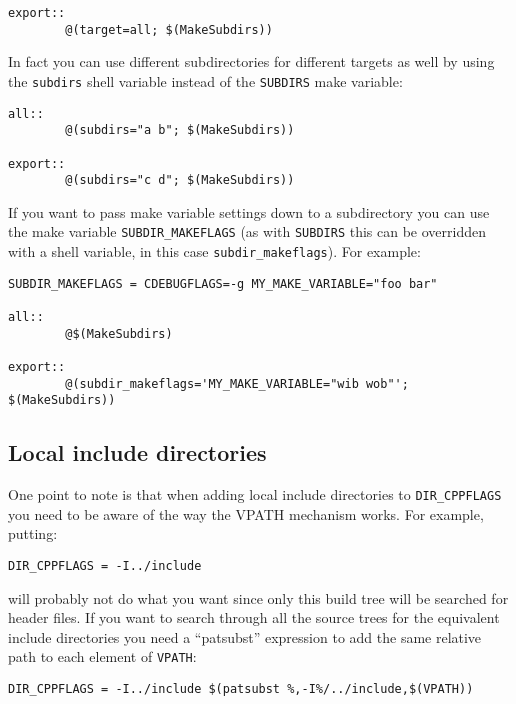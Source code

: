 \documentclass[11pt,twoside,onecolumn]{article}
\begin{document}
{\footnotesize \begin{verbatim}
export::
        @(target=all; $(MakeSubdirs))
\end{verbatim}}

In fact you can use different subdirectories for different targets as well by
using the {\tt subdirs} shell variable instead of the {\tt SUBDIRS} make
variable:

{\footnotesize \begin{verbatim}
all::
        @(subdirs="a b"; $(MakeSubdirs))

export::
        @(subdirs="c d"; $(MakeSubdirs))
\end{verbatim}}

If you want to pass make variable settings down to a subdirectory you can use
the make variable \verb|SUBDIR_MAKEFLAGS| (as with {\tt SUBDIRS} this can be
overridden with a shell variable, in this case \verb|subdir_makeflags|).  For
example:

{\footnotesize \begin{verbatim}
SUBDIR_MAKEFLAGS = CDEBUGFLAGS=-g MY_MAKE_VARIABLE="foo bar"

all::
        @$(MakeSubdirs)

export::
        @(subdir_makeflags='MY_MAKE_VARIABLE="wib wob"'; $(MakeSubdirs))
\end{verbatim}}


\subsection{Local include directories}

One point to note is that when adding local include directories to
\verb|DIR_CPPFLAGS| you need to be aware of the way the VPATH mechanism works.
For example, putting:

{\footnotesize \begin{verbatim}
DIR_CPPFLAGS = -I../include
\end{verbatim}}

will probably not do what you want since only this build tree will be searched
for header files.  If you want to search through all the source trees for the
equivalent include directories you need a ``patsubst'' expression to add the
same relative path to each element of {\tt VPATH}:

{\footnotesize \begin{verbatim}
DIR_CPPFLAGS = -I../include $(patsubst %,-I%/../include,$(VPATH))
\end{verbatim}}
\end{document}
